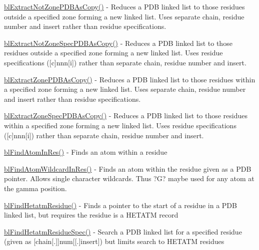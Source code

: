 \begin{DoxyItemize}
\item \hyperlink{_extract_zone_p_d_b_8c_a843e1fe5700de558f774a40c25b0fa3d}{bl\-Extract\-Not\-Zone\-P\-D\-B\-As\-Copy()} -\/ Reduces a P\-D\-B linked list to those residues outside a specified zone forming a new linked list. Uses separate chain, residue number and insert rather than residue specifications.
\item \hyperlink{_extract_zone_p_d_b_8c_ac360be7e19a04c45fb1414d4ed5196b3}{bl\-Extract\-Not\-Zone\-Spec\-P\-D\-B\-As\-Copy()} -\/ Reduces a P\-D\-B linked list to those residues outside a specified zone forming a new linked list. Uses residue specifications (\mbox{[}c\mbox{]}nnn\mbox{[}i\mbox{]}) rather than separate chain, residue number and insert.
\item \hyperlink{_extract_zone_p_d_b_8c_ae7b035cf5bdabc469f32bebb1f4f1b7c}{bl\-Extract\-Zone\-P\-D\-B\-As\-Copy()} -\/ Reduces a P\-D\-B linked list to those residues within a specified zone forming a new linked list. Uses separate chain, residue number and insert rather than residue specifications.
\item \hyperlink{_extract_zone_p_d_b_8c_a9878d0bbb6c8c66afc98fcba4b7cda4b}{bl\-Extract\-Zone\-Spec\-P\-D\-B\-As\-Copy()} -\/ Reduces a P\-D\-B linked list to those residues within a specified zone forming a new linked list. Uses residue specifications (\mbox{[}c\mbox{]}nnn\mbox{[}i\mbox{]}) rather than separate chain, residue number and insert.
\item \hyperlink{_find_atom_in_res_8c_a4ff18b29ee8e6e193250e6acaae6e630}{bl\-Find\-Atom\-In\-Res()} -\/ Finds an atom within a residue
\item \hyperlink{_find_atom_wildcard_in_res_8c_a943790f7ffac1bde621b19cb89758b72}{bl\-Find\-Atom\-Wildcard\-In\-Res()} -\/ Finds an atom within the residue given as a P\-D\-B pointer. Allows single character wildcards. Thus ?G? maybe used for any atom at the gamma position.
\item \hyperlink{_find_hetatm_residue_8c_a8d42eb344a32e2c7ed5a4a377a50a939}{bl\-Find\-Hetatm\-Residue()} -\/ Finds a pointer to the start of a residue in a P\-D\-B linked list, but requires the residue is a H\-E\-T\-A\-T\-M record
\item \hyperlink{_find_hetatm_residue_spec_8c_a192ca18214526a19859f6bf1b7b1b81e}{bl\-Find\-Hetatm\-Residue\-Spec()} -\/ Search a P\-D\-B linked list for a specified residue (given as \mbox{[}chain\mbox{[}.\mbox{]}\mbox{]}num\mbox{[}\mbox{[}.\mbox{]}insert\mbox{]}) but limits search to H\-E\-T\-A\-T\-M residues

\end{DoxyItemize}
